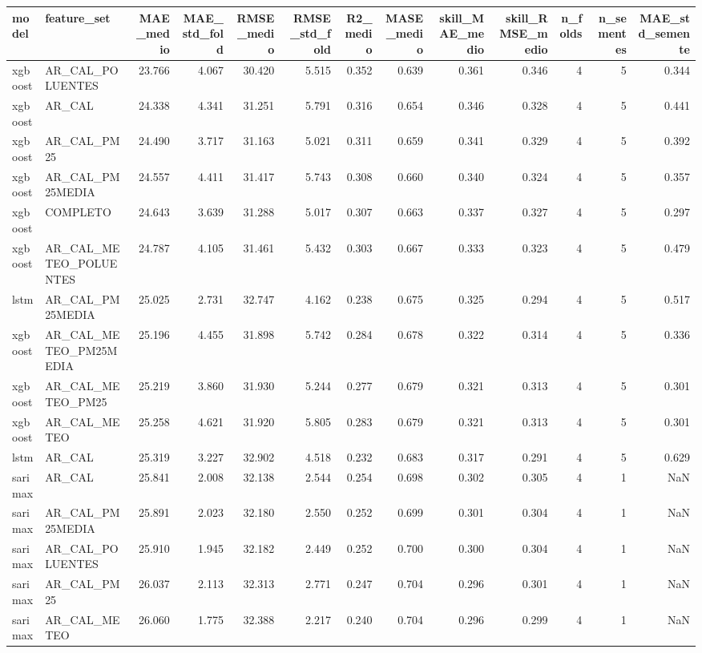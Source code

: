 \begin{tabular}{llrrrrrrrrrrr}
\toprule
model & feature_set & MAE_medio & MAE_std_fold & RMSE_medio & RMSE_std_fold & R2_medio & MASE_medio & skill_MAE_medio & skill_RMSE_medio & n_folds & n_sementes & MAE_std_semente \\
\midrule
xgboost & AR_CAL_POLUENTES & 23.766 & 4.067 & 30.420 & 5.515 & 0.352 & 0.639 & 0.361 & 0.346 & 4 & 5 & 0.344 \\
xgboost & AR_CAL & 24.338 & 4.341 & 31.251 & 5.791 & 0.316 & 0.654 & 0.346 & 0.328 & 4 & 5 & 0.441 \\
xgboost & AR_CAL_PM25 & 24.490 & 3.717 & 31.163 & 5.021 & 0.311 & 0.659 & 0.341 & 0.329 & 4 & 5 & 0.392 \\
xgboost & AR_CAL_PM25MEDIA & 24.557 & 4.411 & 31.417 & 5.743 & 0.308 & 0.660 & 0.340 & 0.324 & 4 & 5 & 0.357 \\
xgboost & COMPLETO & 24.643 & 3.639 & 31.288 & 5.017 & 0.307 & 0.663 & 0.337 & 0.327 & 4 & 5 & 0.297 \\
xgboost & AR_CAL_METEO_POLUENTES & 24.787 & 4.105 & 31.461 & 5.432 & 0.303 & 0.667 & 0.333 & 0.323 & 4 & 5 & 0.479 \\
lstm & AR_CAL_PM25MEDIA & 25.025 & 2.731 & 32.747 & 4.162 & 0.238 & 0.675 & 0.325 & 0.294 & 4 & 5 & 0.517 \\
xgboost & AR_CAL_METEO_PM25MEDIA & 25.196 & 4.455 & 31.898 & 5.742 & 0.284 & 0.678 & 0.322 & 0.314 & 4 & 5 & 0.336 \\
xgboost & AR_CAL_METEO_PM25 & 25.219 & 3.860 & 31.930 & 5.244 & 0.277 & 0.679 & 0.321 & 0.313 & 4 & 5 & 0.301 \\
xgboost & AR_CAL_METEO & 25.258 & 4.621 & 31.920 & 5.805 & 0.283 & 0.679 & 0.321 & 0.313 & 4 & 5 & 0.301 \\
lstm & AR_CAL & 25.319 & 3.227 & 32.902 & 4.518 & 0.232 & 0.683 & 0.317 & 0.291 & 4 & 5 & 0.629 \\
sarimax & AR_CAL & 25.841 & 2.008 & 32.138 & 2.544 & 0.254 & 0.698 & 0.302 & 0.305 & 4 & 1 & NaN \\
sarimax & AR_CAL_PM25MEDIA & 25.891 & 2.023 & 32.180 & 2.550 & 0.252 & 0.699 & 0.301 & 0.304 & 4 & 1 & NaN \\
sarimax & AR_CAL_POLUENTES & 25.910 & 1.945 & 32.182 & 2.449 & 0.252 & 0.700 & 0.300 & 0.304 & 4 & 1 & NaN \\
sarimax & AR_CAL_PM25 & 26.037 & 2.113 & 32.313 & 2.771 & 0.247 & 0.704 & 0.296 & 0.301 & 4 & 1 & NaN \\
sarimax & AR_CAL_METEO & 26.060 & 1.775 & 32.388 & 2.217 & 0.240 & 0.704 & 0.296 & 0.299 & 4 & 1 & NaN \\

\end{tabular}
